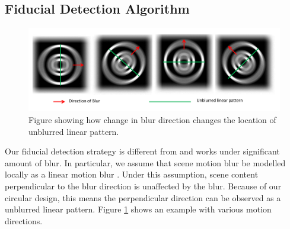 \documentclass[runningheads]{llncs}
\begin{document}
\subsection{Fiducial Detection Algorithm}

\begin{figure}
\centering
\includegraphics[width=\linewidth]{blur_direction.pdf}
\caption{Figure showing how change in blur direction changes the location of
unblurred linear pattern.}
\label{fig:blur_direction}
\end{figure}

Our fiducial detection strategy is different from \cite{NaimarkF02,Pitag13} and works
under significant amount of blur.   In particular, we assume that scene motion
blur be modelled locally as a linear motion blur \cite{Moshe:2003,Moshe:2004}. 
Under this assumption, scene content perpendicular to the blur direction is 
unaffected by the blur.  Because of our circular design, this means the
perpendicular direction can be observed as a unblurred linear pattern.  Figure
\ref{fig:blur_direction} shows an example with various motion directions.

\end{document}
